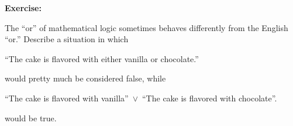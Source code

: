 \documentclass[12pt]{article}
\newcommand{\OR}{\vee}
\newcommand{\ex}[1]{\textbf{Exercise:}\begin{adjustwidth}{2em}{}#1\end{adjustwidth}}
\def\pA{\Phi}
\def\pB{\Psi}
\begin{document}

\ex{
The ``or'' of mathematical logic sometimes behaves differently from the English ``or.''
Describe a situation in which
\begin{center} ``The cake is flavored with either vanilla or chocolate.'' \end{center}
would pretty much be considered false, while
\begin{center} ``The cake is flavored with vanilla''\ $\OR$\ ``The cake is flavored with chocolate''. \end{center}
would be true.
}




\newcommand{\truthtablefour}[5]{
\begin{tabular}{|c|c|c|}
\hline
$\pA$ & $\pB$ & #1 \\ \hline
F     & F  & #2   \\ \hline
F     & T  & #3   \\ \hline
T     & F  & #4   \\ \hline
T     & T  & #5   \\ \hline
\end{tabular}
}

\newcommand{\truthtabletwo}[3]{
\begin{tabular}{|c|c|}
\hline
$\pA$ & #1 \\ \hline
F     & #2   \\ \hline
T     & #3   \\ \hline
\end{tabular}
}


\def\sp{\hspace{1em}}
\end{document}
